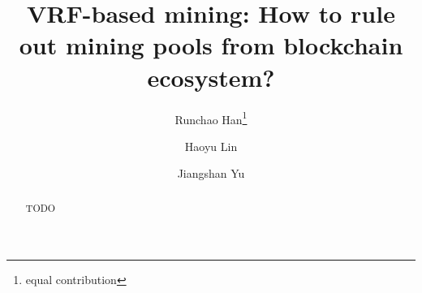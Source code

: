 \documentclass[runningheads]{llncs}
\makeatletter
\newcommand{\printfnsymbol}[1]{%
  \textsuperscript{\@fnsymbol{#1}}%
}
\makeatother
\begin{document}
\title{VRF-based mining: How to rule out mining pools from blockchain ecosystem?}

\author{
    Runchao Han\thanks{equal contribution}
    \and Haoyu Lin\printfnsymbol{1}
    \and Jiangshan Yu
}


\maketitle

\begin{abstract}
    TODO
\end{abstract}














\appendix

\end{document}

